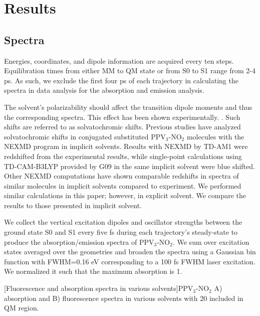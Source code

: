 \section{Results}

\subsection{Spectra}

Energies, coordinates, and dipole information are acquired every ten steps.
Equilibration times from either MM to QM state or from S0 to S1 range from 2-4 ps.
As such, we exclude the first four ps of each trajectory in calculating the spectra in data analysis for the absorption and emission analysis. 

The solvent's polarizability should affect the transition dipole moments and thus the corresponding spectra.  This effect has been shown experimentally. \cite{marcus1956electrostatic,martin1998hydrolysis,Park2013,LeDroumaguet2005}.
Such shifts are referred to as solvatochromic shifts.
Previous studies have analyzed solvatochromic shifts in conjugated substituted PPV\(_3\)-NO\(_2\) molecules with the NEXMD program in implicit solvents.\cite{Santhanamoorthi2009}
Results with NEXMD by TD-AM1 were redshifted from the experimental results, while single-point calculations using TD-CAM-B3LYP provided by G09 in the same implicit solvent were blue shifted.
Other NEXMD computations have shown comparable redshifts in spectra of similar molecules in implicit solvents compared to experiment. \cite{Bjorgaard2015}
We performed similar calculations in this paper; however, in explicit solvent.
We compare the results to those presented in implicit solvent.

We collect the vertical excitation dipoles and oscillator strengths between the ground state S0 and S1 every five fs during each trajectory's steady-state to produce the absorption/emission spectra of PPV\(_3\)-NO\(_2\).
We sum over excitation states averaged over the geometries and broaden the spectra using a Gaussian bin function with FWHM=0.16 eV corresponding to a 100 fs FWHM laser excitation.
We normalized it such that the maximum absorption is 1. 

\noindent
\begin{multiFigure} 
  [Fluorescence and absorption spectra in various solvents]{PPV\(_3\)-NO\(_2\) A) absorption and B) fluorescence spectra in various solvents with 20 included in QM region.}
  \label{fig:spectrasolvents}
\end{multiFigure}\bigskip


